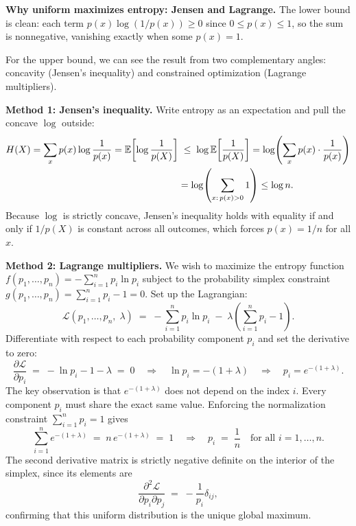 \begin{whybox}
\textbf{Why uniform maximizes entropy: Jensen and Lagrange.}
The lower bound is clean: each term $p(x)\log(1/p(x)) \ge 0$ since
$0 \le p(x) \le 1$, so the sum is nonnegative, vanishing exactly when some $p(x) = 1$.

For the upper bound, we can see the result from two complementary angles: concavity (Jensen's inequality) and constrained optimization (Lagrange multipliers).

\textbf{Method 1: Jensen's inequality.}
Write entropy as an expectation and pull the concave $\log$ outside:
\begin{align*}
  H(X) = \sum_x p(x)\log\frac{1}{p(x)} = \operatorname{\mathbb{E}}\!\left[\log\frac{1}{p(X)}\right]
       &\;\le\; \log \operatorname{\mathbb{E}}\!\left[\frac{1}{p(X)}\right]
        = \log\!\left(\sum_x p(x)\cdot\frac{1}{p(x)}\right) \\
       &= \log\!\left(\sum_{x:\,p(x)>0} 1\right) \le \log n.
\end{align*}
Because $\log$ is strictly concave, Jensen's inequality holds with equality if and only if $1/p(X)$ is constant across all outcomes, which forces $p(x) = 1/n$ for all $x$.

\textbf{Method 2: Lagrange multipliers.}
We wish to maximize the entropy function $f(p_1,\dots,p_n) = -\sum_{i=1}^n p_i \ln p_i$ subject to the probability simplex constraint $g(p_1,\dots,p_n) = \sum_{i=1}^n p_i - 1 = 0$.
Set up the Lagrangian:
\[
  \mathcal{L}(p_1,\dots,p_n,\;\lambda) \;=\; -\sum_{i=1}^n p_i \ln p_i \;-\; \lambda\left(\sum_{i=1}^n p_i - 1\right).
\]
Differentiate with respect to each probability component $p_i$ and set the derivative to zero:
\[
  \frac{\partial \mathcal{L}}{\partial p_i} \;=\; -\ln p_i - 1 - \lambda \;=\; 0
  \quad\Longrightarrow\quad
  \ln p_i = -(1+\lambda)
  \quad\Longrightarrow\quad
  p_i = e^{-(1+\lambda)}.
\]
The key observation is that $e^{-(1+\lambda)}$ does not depend on the index $i$. Every component $p_i$ must share the exact same value. Enforcing the normalization constraint $\sum_{i=1}^n p_i = 1$ gives
\[
  \sum_{i=1}^n e^{-(1+\lambda)} \;=\; n\,e^{-(1+\lambda)} \;=\; 1
  \quad\Longrightarrow\quad
  p_i \;=\; \frac{1}{n} \quad\text{for all } i=1,\dots,n.
\]
The second derivative matrix is strictly negative definite on the interior of the simplex, since its elements are
\[
  \frac{\partial^2 \mathcal{L}}{\partial p_i \partial p_j} \;=\; -\frac{1}{p_i}\delta_{ij},
\]
confirming that this uniform distribution is the unique global maximum.
\end{whybox}

